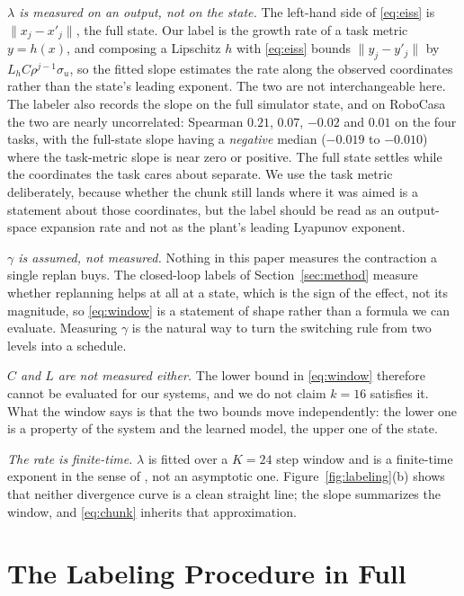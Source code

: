 \emph{$\lambda$ is measured on an output, not on the state.} The left-hand side
of \eqref{eq:eiss} is $\lVert x_j - x'_j\rVert$, the full state. Our label is
the growth rate of a task metric $y = h(x)$, and composing a Lipschitz $h$ with
\eqref{eq:eiss} bounds $\lVert y_j - y'_j\rVert$ by $L_h C \rho^{j-1}\sigma_u$,
so the fitted slope estimates the rate along the observed coordinates rather
than the state's leading exponent. The two are not interchangeable here. The
labeler also records the slope on the full simulator state, and on RoboCasa the
two are nearly uncorrelated: Spearman $0.21$, $0.07$, $-0.02$ and $0.01$ on the
four tasks, with the full-state slope having a \emph{negative} median
($-0.019$ to $-0.010$) where the task-metric slope is near zero or positive.
The full state settles while the coordinates the task cares about separate. We
use the task metric deliberately, because whether the chunk still lands where
it was aimed is a statement about those coordinates, but the label should be
read as an output-space expansion rate and not as the plant's leading Lyapunov
exponent.

\emph{$\gamma$ is assumed, not measured.} Nothing in this paper measures the
contraction a single replan buys. The closed-loop labels of
Section~\ref{sec:method} measure whether replanning helps at all at a state,
which is the sign of the effect, not its magnitude, so \eqref{eq:window} is a
statement of shape rather than a formula we can evaluate. Measuring $\gamma$ is
the natural way to turn the switching rule from two levels into a schedule.

\emph{$C$ and $L$ are not measured either.} The lower bound in
\eqref{eq:window} therefore cannot be evaluated for our systems, and we do not
claim $k{=}16$ satisfies it. What the window says is that the two bounds move
independently: the lower one is a property of the system and the learned model,
the upper one of the state.

\emph{The rate is finite-time.} $\lambda$ is fitted over a $K{=}24$ step window
and is a finite-time exponent in the sense of \citet{haller2015lcs}, not an
asymptotic one. Figure~\ref{fig:labeling}(b) shows that neither divergence curve
is a clean straight line; the slope summarizes the window, and
\eqref{eq:chunk} inherits that approximation.

\section{The Labeling Procedure in Full}
\label{app:labeling}

